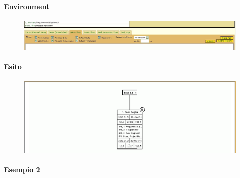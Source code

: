 \paragraph{Environment}
\begin{figure}[h!]
\centering
\includegraphics[width=\textwidth]{tests/TEST_WBS/4.1/4.1_1/Esempio_1/environment.png}
\end{figure}

\paragraph{Esito}
\begin{figure}[h!]
\centering
\includegraphics[width=\textwidth]{tests/TEST_WBS/4.1/4.1_1/Esempio_1/output.png}
\end{figure}
\newpage


\paragraph{Esempio 2}

